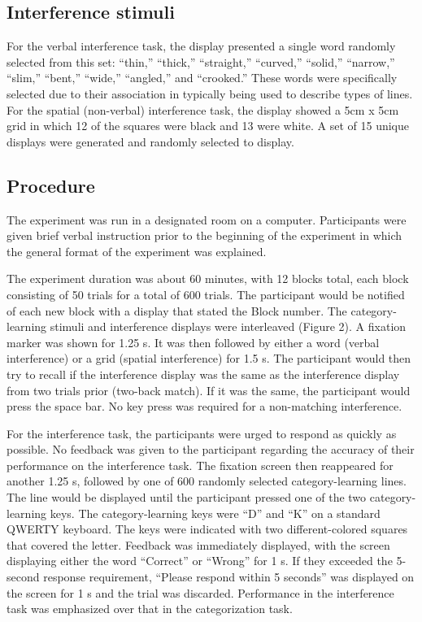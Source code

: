 \documentclass[apacite, draftfirst, jou]{apa6}
\begin{document}
\subsection{Interference stimuli}
For the verbal interference task, the display presented a single word randomly
selected from this set: “thin,” “thick,” “straight,” “curved,” “solid,”
“narrow,” “slim,” “bent,” “wide,” “angled,” and “crooked.” These words were
specifically selected due to their association in typically being used to
describe types of lines. For the spatial (non-verbal) interference task, the
display showed a 5cm x 5cm grid in which 12 of the squares were black and 13
were white. A set of 15 unique displays were generated and randomly selected to
display.

\subsection{Procedure}
The experiment was run in a designated room on a computer. Participants were
given brief verbal instruction prior to the beginning of the experiment in which
the general format of the experiment was explained.

The experiment duration was about 60 minutes, with 12 blocks total, each block
consisting of 50 trials for a total of 600 trials. The participant would be
notified of each new block with a display that stated the Block number. The
category-learning stimuli and interference displays were interleaved (Figure 2).
A fixation marker was shown for 1.25 s. It was then followed by either a word
(verbal interference) or a grid (spatial interference) for 1.5 s. The
participant would then try to recall if the interference display was the same as
the interference display from two trials prior (two-back match). If it was the
same, the participant would press the space bar. No key press was required for a
non-matching interference.

For the interference task, the participants were urged to respond as quickly as
possible. No feedback was given to the participant regarding the accuracy of
their performance on the interference task. The fixation screen then reappeared
for another 1.25 s, followed by one of 600 randomly selected category-learning
lines. The line would be displayed until the participant pressed one of the two
category-learning keys. The category-learning keys were “D” and “K” on a
standard QWERTY keyboard. The keys were indicated with two different-colored
squares that covered the letter. Feedback was immediately displayed, with the
screen displaying either the word “Correct” or “Wrong” for 1 s. If they exceeded
the 5-second response requirement, “Please respond within 5 seconds” was
displayed on the screen for 1 s and the trial was discarded. Performance in the
interference task was emphasized over that in the categorization task.
\end{document}
